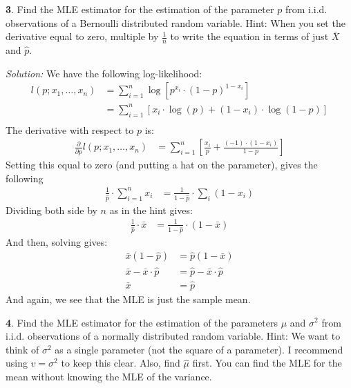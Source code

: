 \documentclass{tufte-handout}
\begin{document}
\textbf{3}. Find the MLE estimator for the estimation of the parameter $p$ from
i.i.d. observations of a Bernoulli distributed random variable. Hint:
When you set the derivative equal to zero, multiple by $\frac{1}{n}$ to
write the equation in terms of just $\bar{X}$ and $\hat{p}$. 

\textit{Solution:} We have the following log-likelihood:
\begin{align*}
l(p; x_1, \ldots, x_n) &= \sum_{i=1}^n \log\left[ p^{x_i} \cdot (1 - p)^{1-x_i} \right]  \\
&= \sum_{i=1}^n \left[x_i \cdot \log(p) + (1-x_i) \cdot \log(1 - p) \right]  \\
\end{align*}
The derivative with respect to $p$ is:
\begin{align*}
\frac{\partial}{\partial p} l(p; x_1, \ldots, x_n)
&= \sum_{i=1}^n \left[ \frac{x_i}{p} + \frac{(-1) \cdot (1-x_i)}{1-p}  \right] 
\end{align*}
Setting this equal to zero (and putting a hat on the parameter), gives the following
\begin{align*}
\frac{1}{\hat{p}} \cdot \sum_{i=1}^n x_i &= \frac{1}{1-\hat{p}} \cdot \sum_i (1-x_i)
\end{align*}
Dividing both side by $n$ as in the hint gives:
\begin{align*}
\frac{1}{\hat{p}} \cdot \bar{x} &= \frac{1}{1-\hat{p}} \cdot (1-\bar{x})
\end{align*}
And then, solving gives:
\begin{align*}
\bar{x} (1 - \hat{p}) &= \hat{p} (1 - \bar{x}) \\
\bar{x} - \bar{x} \cdot \hat{p} &= \hat{p} - \bar{x} \cdot \hat{p} \\
\bar{x} &= \hat{p}
\end{align*}
And again, we see that the MLE is just the sample mean.

\textbf{4}. Find the MLE estimator for the estimation of the parameters $\mu$ and $\sigma^2$
from i.i.d. observations of a normally distributed random variable. Hint: We
want to think of $\sigma^2$ as a single parameter (not the square of a parameter).
I recommend using $v = \sigma^2$ to keep this clear. Also, find $\hat{\mu}$ first.
You can find the MLE for the mean without knowing the MLE of the variance.
\end{document}
